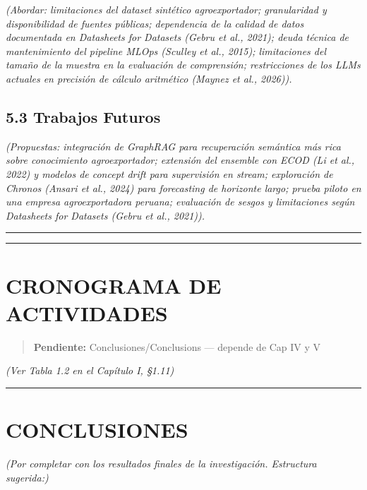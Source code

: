 \emph{(Abordar: limitaciones del dataset sintético agroexportador;
granularidad y disponibilidad de fuentes públicas; dependencia de la
calidad de datos documentada en Datasheets for Datasets (Gebru et al.,
2021); deuda técnica de mantenimiento del pipeline MLOps (Sculley et
al., 2015); limitaciones del tamaño de la muestra en la evaluación de
comprensión; restricciones de los LLMs actuales en precisión de cálculo
aritmético (Maynez et al., 2026)).}

\subsection{5.3 Trabajos Futuros}\label{trabajos-futuros}

\emph{(Propuestas: integración de GraphRAG para recuperación semántica
más rica sobre conocimiento agroexportador; extensión del ensemble con
ECOD (Li et al., 2022) y modelos de concept drift para supervisión en
stream; exploración de Chronos (Ansari et al., 2024) para forecasting de
horizonte largo; prueba piloto en una empresa agroexportadora peruana;
evaluación de sesgos y limitaciones según Datasheets for Datasets (Gebru
et al., 2021)).}

\begin{center}\rule{0.5\linewidth}{0.5pt}\end{center}

\begin{center}\rule{0.5\linewidth}{0.5pt}\end{center}

\section{CRONOGRAMA DE ACTIVIDADES}\label{cronograma-de-actividades-1}

\begin{quote}
\textbf{Pendiente:} Conclusiones/Conclusions --- depende de Cap IV y V
\end{quote}

\emph{(Ver Tabla 1.2 en el Capítulo I, §1.11)}

\begin{center}\rule{0.5\linewidth}{0.5pt}\end{center}

\section{CONCLUSIONES}\label{conclusiones-1}

\emph{(Por completar con los resultados finales de la investigación.
Estructura sugerida:)}

